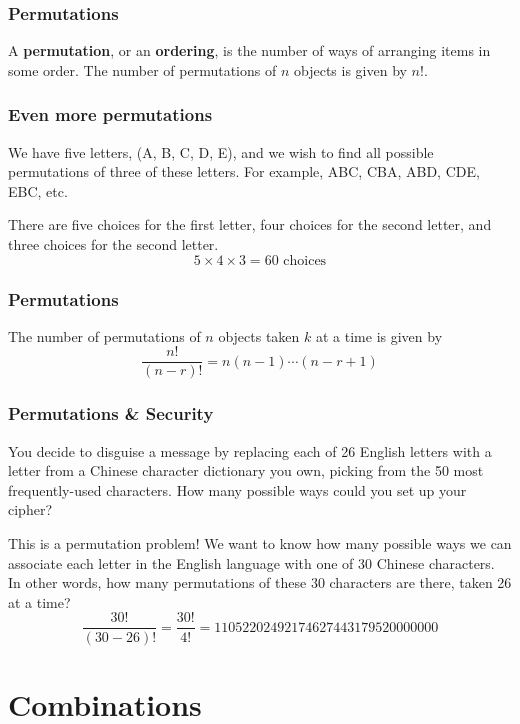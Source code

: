 \documentclass{beamer}
\newcommand{\<}{\langle}
\renewcommand{\>}{\rangle}
\begin{document}
\begin{frame}
\frametitle{Permutations}

A \textbf{permutation}, or an \textbf{ordering}, is the number of ways of arranging items in some order. {\color{red}The number of permutations of $n$ objects is given by $n!$.}
\end{frame}

\begin{frame}
\frametitle{Even more permutations}

We have five letters, (A, B, C, D, E), and we wish to find all possible permutations of three of these letters. For example, ABC, CBA, ABD, CDE, EBC, etc. \newline

\pause

There are five choices for the first letter, four choices for the second letter, and three choices for the second letter.
\[
5\times 4 \times 3 = 60 \text{ choices}
\]
\end{frame}


\begin{frame}
\frametitle{Permutations}

The number of permutations of $n$ objects taken $k$ at a time is given by
\[
\frac{n!}{(n-r)!} = n(n-1)\cdots(n-r+1)
\]
\end{frame}

\begin{frame}
\frametitle{Permutations \& Security}

You decide to disguise a message by replacing each of 26 English letters with a letter from a Chinese character dictionary you own, picking from the 50 most frequently-used characters.  How many possible ways could you set up your cipher?\newline 

\pause

This is a permutation problem! We want to know how many possible ways we can associate each letter in the English language with one of 30 Chinese characters. In other words, how many permutations of these 30 characters are there, taken 26 at a time?
\[
\frac{30!}{(30-26)!} = \frac{30!}{4!} = 11052202492174627443179520000000
\]
\end{frame}

\section{Combinations} 
\end{document}
